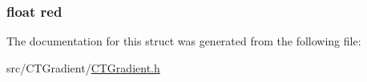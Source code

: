 \hypertarget{struct___c_t_gradient_element_acddf4f34ba92c602d4205ba50e98d603}{
\subsubsection[{red}]{\setlength{\rightskip}{0pt plus 5cm}float red}}\label{struct___c_t_gradient_element_acddf4f34ba92c602d4205ba50e98d603}


The documentation for this struct was generated from the following file\-:\begin{DoxyCompactItemize}
\item 
src/\-C\-T\-Gradient/\hyperlink{_c_t_gradient_8h}{C\-T\-Gradient.\-h}\end{DoxyCompactItemize}
